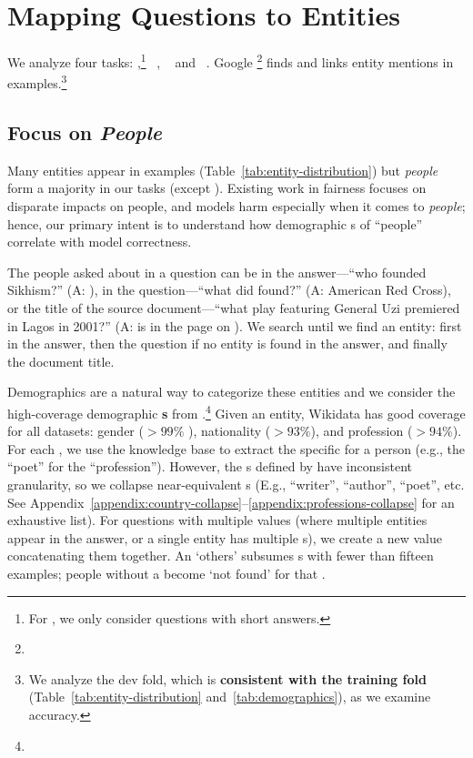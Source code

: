 
\section{Mapping Questions to Entities}
\label{sec:mapping}

We analyze four  tasks: \nq{},\footnote{For \nq{}, we only consider questions with short answers.} \squad~\cite{rajpurkar-16}, \qb~\cite{boyd-graber-12} and \triviaqa~\cite{joshi-17}.
Google \footnote{} finds and links entity mentions in \qa{} examples.\footnote{We analyze the dev fold, which is {\bf consistent with the training fold} (Table~\ref{tab:entity-distribution} and~\ref{tab:demographics}), as we examine accuracy.}

\subsection{Focus on \emph{People}}
\label{subsec:people}
Many entities appear in examples (Table~\ref{tab:entity-distribution}) but \emph{people} form a majority in our  tasks (except \squad{}). Existing work in  fairness focuses on disparate impacts on people, and models harm especially when it comes to \emph{people}; hence, our primary intent is to understand how demographic \democol{}s of ``people'' correlate with model correctness.

The people asked about in a question can be in the answer---``who founded Sikhism?'' (A: ), in the question---``what did  found?'' (A: American Red Cross), or the title of the source document---``what play featuring General Uzi premiered in Lagos in 2001?'' (A:  is in the page on ).
We search until we find an entity: first in the answer, then the question if no entity is found in the answer, and finally the document title.

Demographics are a natural way to categorize these entities and we consider the high-coverage demographic {\bf \democol{}s} from \wikidata{}.\footnote{}
Given an entity, Wikidata has good coverage for all datasets: gender ($>99\%$ ), nationality ($>93\%$), and profession ($>94\%$).
For each \democol{}, we use the knowledge base to extract the specific {\bf \demorow{}} for a person (e.g., the \demorow{} ``poet'' for the \democol{} ``profession'').
However, the \demorow{}s defined by \wikidata{} have inconsistent granularity, so we collapse near-equivalent \demorow{}s (E.g., ``writer'', ``author'', ``poet'', etc. See Appendix~\ref{appendix:country-collapse}--\ref{appendix:professions-collapse} for an exhaustive list).
For questions with multiple values (where multiple entities appear in the answer, or a single entity has multiple \demorow{}s), we create a new value concatenating them together. 
An `others’ \demorow{} subsumes \demorow{}s with fewer than fifteen examples; people without a \demorow{} become `not found' for that \democol{}.



